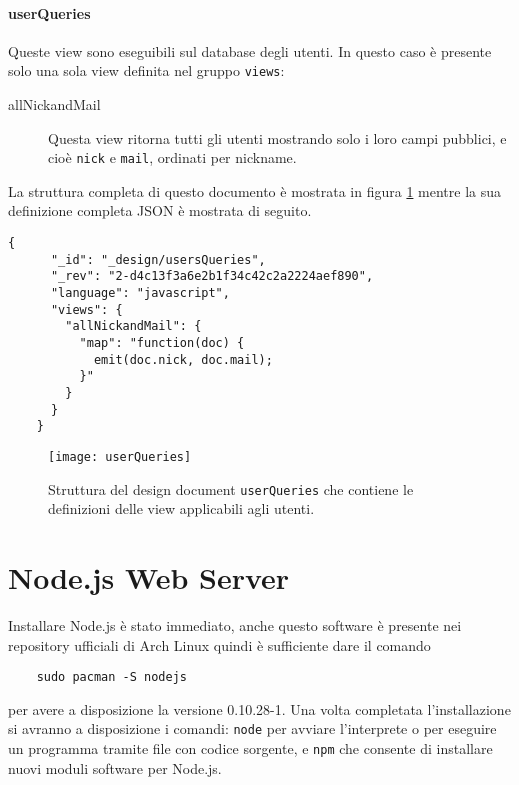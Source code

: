                 \paragraph{userQueries} Queste view sono eseguibili sul
                database degli utenti. In questo caso è presente solo una sola
                view definita nel gruppo \texttt{views}:
                \begin{description}
                    \item[allNickandMail] Questa view ritorna tutti gli utenti
                    mostrando solo i loro campi pubblici, e cioè \texttt{nick}
                    e \texttt{mail}, ordinati per nickname.
                \end{description}
                La struttura completa di questo documento è mostrata in
                figura \ref{fig:userQueries} mentre la sua definizione completa
                JSON è mostrata di seguito.
                \begin{lstlisting}[language=plane]
    {
      "_id": "_design/usersQueries",
      "_rev": "2-d4c13f3a6e2b1f34c42c2a2224aef890",
      "language": "javascript",
      "views": {
        "allNickandMail": {
          "map": "function(doc) {
            emit(doc.nick, doc.mail);
          }"
        }
      }
    }
                \end{lstlisting}
                \begin{figure}[H]
                    \centering
                    \texttt{[image: userQueries]}
                    \caption{
                        Struttura del design document \texttt{userQueries} che
                        contiene le definizioni delle view applicabili agli
                        utenti.
                    }
                    \label{fig:userQueries}
                \end{figure}


    \section{Node.js Web Server}
        Installare Node.js è stato immediato, anche questo software è
        presente nei repository ufficiali di Arch Linux quindi è sufficiente
        dare il comando
        \begin{lstlisting}
    sudo pacman -S nodejs
        \end{lstlisting}
        per avere a disposizione la versione 0.10.28-1. Una volta completata
        l'installazione si avranno a disposizione i comandi: \texttt{node}
        per avviare l'interprete o per eseguire un programma tramite file con
        codice sorgente, e \texttt{npm} che consente di installare nuovi
        moduli software per Node.js.

